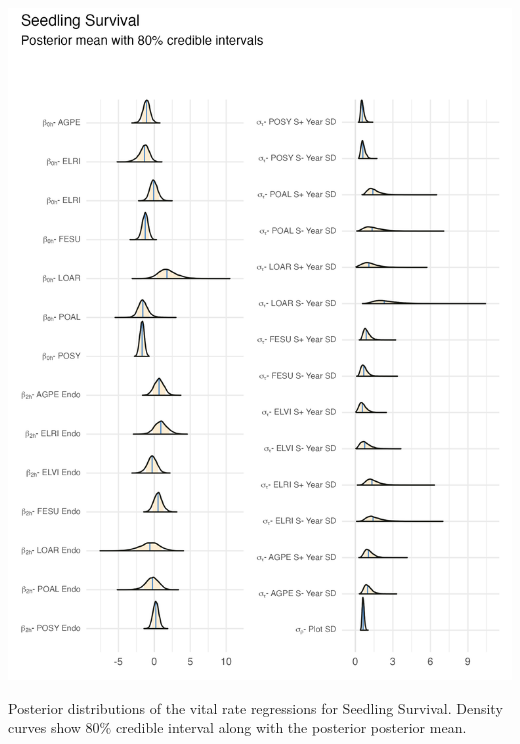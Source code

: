 \documentclass[lineno, sn-basic]{sn-jnl}%
\begin{document}
\begin{myfigure}[H]
	\centering
	\includegraphics[width = \linewidth]{seedsurv_posteriors_plot.png}
	\caption[Posterior distributions of the vital rate regressions for Seedling Survival]{Posterior distributions of the vital rate regressions for Seedling Survival. Density curves show $80\%$ credible interval along with the posterior posterior mean.}
\end{myfigure}
\end{document}
